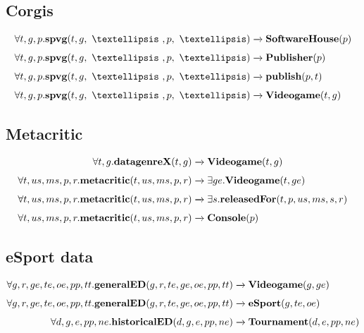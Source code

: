 \subsection*{Corgis}
\begin{subequations}
	\begin{align}
	\forall t,g,p.\textbf{spvg}(t,g,\ …\ ,p,\ …) &\alignarrow \textbf{SoftwareHouse}(p) \\[4pt]
	\forall t,g,p.\textbf{spvg}(t,g,\ …\ ,p,\ …) &\alignarrow \textbf{Publisher}(p) \\[4pt]
	\forall t,g,p.\textbf{spvg}(t,g,\ …\ ,p,\ …) &\alignarrow \textbf{publish}(p,t) \\[4pt]
	\forall t,g,p.\textbf{spvg}(t,g,\ …\ ,p,\ …) &\alignarrow \textbf{Videogame}(t,g)
	\end{align}
\end{subequations}

\subsection*{Metacritic}
\begin{subequations}
	\begin{align}
	\forall t,g.\textbf{datagenreX}(t,g) &\alignarrow \textbf{Videogame}(t,g) \\[4pt]
	\forall t,us,ms,p,r.\textbf{metacritic}(t,us,ms,p,r) &\alignarrow \exists ge. \textbf{Videogame}(t,ge) \\[4pt]
	\forall t,us,ms,p,r.\textbf{metacritic}(t,us,ms,p,r) &\alignarrow \exists s. \textbf{releasedFor}(t,p,us,ms,s,r) \\[4pt]
	\forall t,us,ms,p,r.\textbf{metacritic}(t,us,ms,p,r) &\alignarrow \textbf{Console}(p)
	\end{align}
\end{subequations}

\subsection*{eSport data}
\begin{subequations}
	\begin{align}
	\forall g, r,ge,te,oe,pp,tt.\textbf{generalED}(g, r,te,ge,oe,pp,tt) &\alignarrow \textbf{Videogame}(g,ge) \\[4pt]
	\forall g, r,ge,te,oe,pp,tt.\textbf{generalED}(g, r,te,ge,oe,pp,tt) &\alignarrow \textbf{eSport}(g,te,oe) \\[4pt]
	\forall d,g,e,pp,ne.\textbf{historicalED}(d,g,e,pp,ne) &\alignarrow \textbf{Tournament}(d,e,pp,ne)
	\end{align}
\end{subequations}
